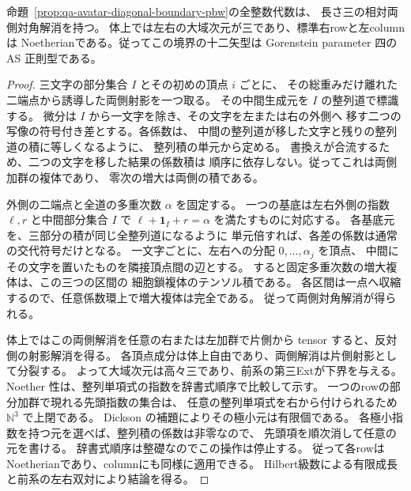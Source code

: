 \begin{corollary}[三次補正が零の二交点境界でのAS正則性]
\label{cor:qa-avatar-diagonal-boundary-regular}
命題~\ref{prop:qa-avatar-diagonal-boundary-pbw}の全整数代数は、
長さ三の相対両側対角解消を持つ。
体上では左右の大域次元が三であり、標準右rowと左columnは
Noetherianである。従ってこの境界の十二矢型は
Gorenstein parameter 四の AS 正則型である。
\end{corollary}
\begin{proof}
三文字の部分集合 $I$ とその初めの頂点 $i$ ごとに、
その総重みだけ離れた二端点から誘導した両側射影を一つ取る。
その中間生成元を $I$ の整列道で標識する。
微分は $I$ から一文字を除き、その文字を左または右の外側へ
移す二つの写像の符号付き差とする。各係数は、
中間の整列道が移した文字と残りの整列道の積に等しくなるように、
整列積の単元から定める。
書換えが合流するため、二つの文字を移した結果の係数積は
順序に依存しない。従ってこれは両側加群の複体であり、
零次の増大は両側の積である。

外側の二端点と全道の多重次数 $\alpha$ を固定する。
一つの基底は左右外側の指数 $\ell,r$ と中間部分集合 $I$ で
$\ell+\mathbf1_I+r=\alpha$ を満たすものに対応する。
各基底元を、三部分の積が同じ全整列道になるように
単元倍すれば、各差の係数は通常の交代符号だけとなる。
一文字ごとに、左右への分配 $0,\ldots,\alpha_j$ を頂点、
中間にその文字を置いたものを隣接頂点間の辺とする。
すると固定多重次数の増大複体は、この三つの区間の
細胞鎖複体のテンソル積である。
各区間は一点へ収縮するので、任意係数環上で増大複体は完全である。
従って両側対角解消が得られる。

体上ではこの両側解消を任意の右または左加群で片側から
tensor すると、反対側の射影解消を得る。
各頂点成分は体上自由であり、両側解消は片側射影として分裂する。
よって大域次元は高々三であり、前系の第三Extが下界を与える。
Noether 性は、整列単項式の指数を辞書式順序で比較して示す。
一つのrowの部分加群で現れる先頭指数の集合は、
任意の整列単項式を右から付けられるため $\mathbb N^3$ で上閉である。
Dickson の補題によりその極小元は有限個である。
各極小指数を持つ元を選べば、整列積の係数は非零なので、
先頭項を順次消して任意の元を書ける。
辞書式順序は整礎なのでこの操作は停止する。
従って各rowはNoetherianであり、columnにも同様に適用できる。
Hilbert級数による有限成長と前系の左右双対により結論を得る。
\end{proof}

